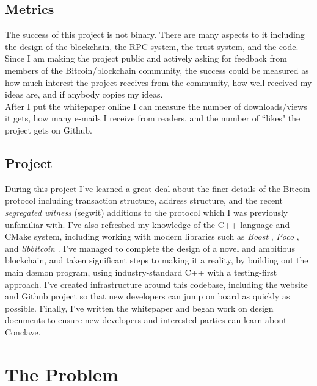 \documentclass{report}
\begin{document}
	\section{Metrics}
		The success of this project is not binary. There are many aspects to it including the design of the blockchain, the RPC system, the trust system, and the code. Since I am making the project public and actively asking for feedback from members of the Bitcoin/blockchain community, the success could be measured as how much interest the project receives from the community, how well-received my ideas are, and if anybody copies my ideas. \\

After I put the whitepaper online I can measure the number of downloads/views it gets, how many e-mails I receive from readers, and the number of ``likes" the project gets on Github.
	\section{Project}
		During this project I’ve learned a great deal about the finer details of the Bitcoin protocol including transaction structure, address structure, and the recent \textit{segregated witness} (segwit) \cite{segwit} additions to the protocol which I was previously unfamiliar with. I’ve also refreshed my knowledge of the C++  language and CMake  system, including working with modern libraries such as \textit{Boost} , \textit{Poco} , and \textit{libbitcoin} . I’ve managed to complete the design of a novel and ambitious blockchain, and taken significant steps to making it a reality, by building out the main dæmon program, using industry-standard C++ with a testing-first approach. I’ve created infrastructure around this codebase, including the website and Github project so that new developers can jump on board as quickly as possible. Finally, I’ve written the whitepaper and began work on design documents to ensure new developers and interested parties can learn about Conclave.
		
\chapter{The Problem}
\end{document}
